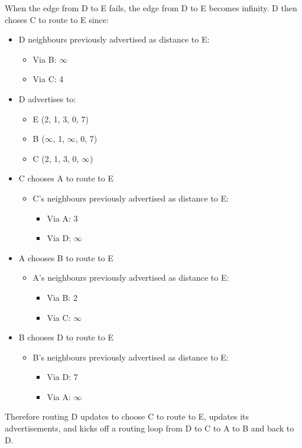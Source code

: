\documentclass[12pt]{article}
\begin{document}
When the edge from D to E fails, the edge from D to E becomes infinity. D then choses C to route to E since:
\begin{itemize}
\item D neighbours previously advertised as distance to E:
\begin{itemize}
\item Via B: $\infty$
\item Via C: 4
\end{itemize}
\end{itemize}

\begin{itemize}
\item D advertises to:
\begin{itemize}
\item E (2, 1, 3, 0, 7)
\item B ($\infty$, 1, $\infty$, 0, 7)
\item C (2, 1, 3, 0, $\infty$)
\end{itemize}
\item C chooses A to route to E
\begin{itemize}
\item C’s neighbours previously advertised as distance to E:
\begin{itemize}
\item Via A: 3
\item Via D: $\infty$
\end{itemize}
\end{itemize}
\item A chooses B to route to E
\begin{itemize}
\item A’s neighbours previously advertised as distance to E:
\begin{itemize}
\item Via B: 2
\item Via C: $\infty$
\end{itemize}
\end{itemize}
\item B chooses D to route to E
\begin{itemize}
\item B’s neighbours previously advertised as distance to E:
\begin{itemize}
\item Via D: 7
\item Via A: $\infty$
\end{itemize}
\end{itemize}
\end{itemize}

Therefore routing D updates to choose C to route to E, updates its advertisements, and kicks off a routing loop from D to C to A to B and back to D.
\end{document}
